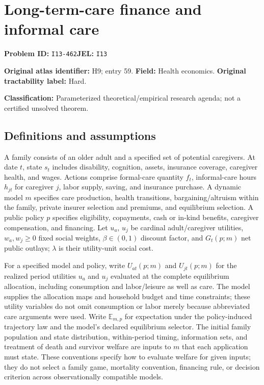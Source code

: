 \documentclass[11pt,a4paper]{article}
\begin{document}
\section*{Long-term-care finance and informal care}
\textbf{Problem ID:} \texttt{I13-462}\quad \textbf{JEL:} \texttt{I13}\par
\label{problem:OP-0059}
\label{atlas:prob:H9}
\noindent\textbf{Original atlas identifier:} H9; entry 59. \textbf{Field:} Health economics. \textbf{Original tractability label:} Hard.

\noindent\textbf{Classification:} Parameterized theoretical/empirical research agenda; not a certified unsolved theorem.

\subsection*{Definitions and assumptions}
A family consists of an older adult and a specified set of potential caregivers. At date $t$, state $s_t$ includes disability, cognition, assets, insurance coverage, caregiver health, and wages. Actions comprise formal-care quantity $f_t$, informal-care hours $h_{jt}$ for caregiver $j$, labor supply, saving, and insurance purchase. A dynamic model $m$ specifies care production, health transitions, bargaining/altruism within the family, private insurer selection and premiums, and equilibrium selection. A public policy $p$ specifies eligibility, copayments, cash or in-kind benefits, caregiver compensation, and financing. Let $u_a$, $u_j$ be cardinal adult/caregiver utilities, $w_a,w_j\geq0$ fixed social weights, $\beta\in(0,1)$ discount factor, and $G_t(p;m)$ net public outlays; $\lambda$ is their utility-unit social cost.

For a specified model and policy, write $U_{at}(p;m)$ and $U_{jt}(p;m)$ for the realized period utilities $u_a$ and $u_j$ evaluated at the complete equilibrium allocation, including consumption and labor/leisure as well as care. The model supplies the allocation maps and household budget and time constraints; these utility variables do not omit consumption or labor merely because abbreviated care arguments were used. Write $\mathbb E_{m,p}$ for expectation under the policy-induced trajectory law and the model's declared equilibrium selector. The initial family population and state distribution, within-period timing, information sets, and treatment of death and survivor welfare are inputs to $m$ that each application must state. These conventions specify how to evaluate welfare for given inputs; they do not select a family game, mortality convention, financing rule, or decision criterion across observationally compatible models.
\end{document}
